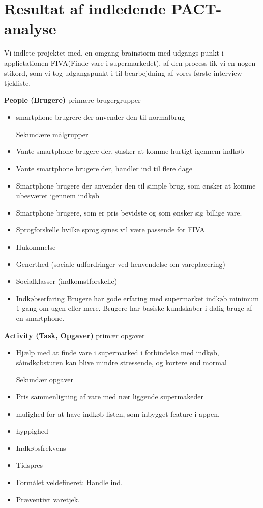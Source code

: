 \documentclass[12pt]{article}
\begin{document}
\newpage
\section{Resultat af indledende PACT-analyse}
Vi indlete projektet med, en omgang brainstorm med udgangs punkt i applictationen FIVA(Finde vare i supermarkedet), af den process fik vi 
en nogen stikord, som vi tog udgangspunkt i til bearbejdning af vores f\o rste interview tjekliste.
 
\textbf{People (Brugere)}
prim\ae re brugergrupper 
\begin{itemize} 
\item smartphone brugrere der anvender den til normalbrug

Sekund\ae re m\aa lgrupper
\item Vante smartphone brugere der, \o nsker at komme hurtigt igennem indk\o b
\item Vante smartphone brugere der, handler ind til flere dage
\item Smartphone brugere der anvender den til simple brug, som \o nsker at komme ubesv\ae ret igennem indk\o b
\item Smartphone brugere, som er pris bevidste og som \o nsker sig billige vare.


\item Sprogforskelle hvilke sprog synes vil v\ae re passende for FIVA
\item Hukommelse 
\item Generthed (sociale udfordringer ved henvendelse om vareplacering)
\item Socialklasser (indkomstforskelle)
\item Indkøbserfaring
Brugere har gode erfaring med supermarket indk\o b minimum 1 gang om ugen eller mere.
Brugere har basiske kundskaber i dalig bruge af en smartphone. 
\end{itemize}

\textbf{Activity (Task, Opgaver)}
prim\ae r opgaver 
\begin{itemize}
\item Hj\ae lp med at finde vare i supermarked i forbindelse med indk\o b, s\aa indk\o bsturen kan blive mindre stressende, 
og kortere end mormal 

Sekund\ae r opgaver 
\item Pris sammenligning af vare med n\ae r liggende supermakeder 
\item mulighed for at have indk\o b listen, som inbygget feature i appen.
\item hyppighed - 
\item Indkøbsfrekvens  
\item Tidspres
\item Formålet veldefineret: Handle ind.
\item Præventivt varetjek. 
\end{itemize}
\end{document}
